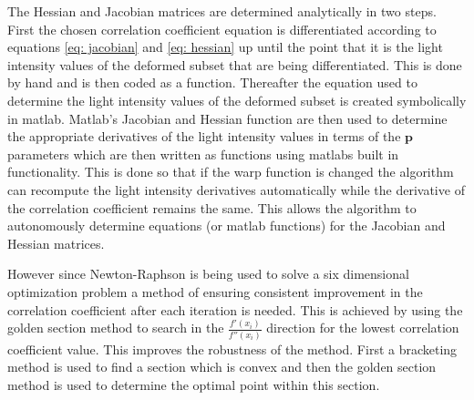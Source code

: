The Hessian and Jacobian matrices are determined analytically in two steps. First the chosen correlation coefficient equation is differentiated according to equations \ref{eq: jacobian} and \ref{eq: hessian} up until the point that it is the light intensity values of the deformed subset that are being differentiated. This is done by hand and is then coded as a function. Thereafter the equation used to determine the light intensity values of the deformed subset is created symbolically in matlab. Matlab's Jacobian and Hessian function are then used to determine the appropriate derivatives of the light intensity values in terms of the $\bm{p}$ parameters which are then written as functions using matlabs built in functionality. This is done so that if the warp function is changed the algorithm can recompute the light intensity derivatives automatically while the derivative of the correlation coefficient remains the same. This allows the algorithm to autonomously determine equations (or matlab functions) for the Jacobian and Hessian matrices.



However since Newton-Raphson is being used to solve a six dimensional optimization problem a method of ensuring consistent improvement in the correlation coefficient after each iteration is needed. This is achieved by using the golden section method to search in the $\frac{f'(x_i)}{f''(x_i)}$ direction for the lowest correlation coefficient value. This improves the robustness of the method. First a bracketing method is used to find a section which is convex and then the golden section method is used to determine the optimal point within this section.




